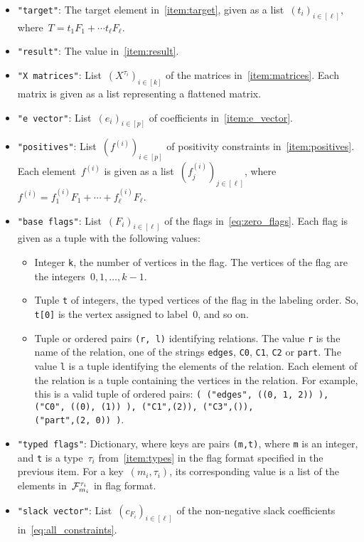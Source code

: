 \documentclass[11pt,a4paper,reqno]{amsart}
\begin{document}
\begin{itemize}
\item \verb|"target"|: The target element in~\ref{item:target}, given as a
  list~$(t_i)_{i \in [\ell]}$, where~$T = t_1F_1 + \cdots t_\ell F_\ell$.
\item \verb|"result"|: The value in~\ref{item:result}.
\item \verb|"X matrices"|: List~$(X^{\tau_i})_{i \in [k]}$ of the matrices in~\ref{item:matrices}. Each
  matrix is given as a list representing a flattened matrix.
\item \verb|"e vector"|: List~$(e_i)_{i \in [p]}$ of coefficients in~\ref{item:e_vector}.
\item \verb|"positives"|: List~$(f^{(i)})_{i \in [p]}$ of positivity constraints
  in~\ref{item:positives}. Each element~$f^{(i)}$ is given as a
  list~$(f^{(i)}_j)_{j \in [\ell]}$, where~$f^{(i)} = f^{(i)}_1 F_1 + \cdots + f^{(i)}_\ell F_\ell$.
\item \verb|"base flags"|: List~$(F_i)_{i \in [\ell]}$ of the flags in~\eqref{eq:zero_flags}. Each
  flag is given as a tuple with the following values:
  \begin{itemize}
  \item Integer \verb|k|, the number of vertices in the flag. The vertices of the flag
    are the integers~$0, 1, \dots, k - 1$.
  \item Tuple \verb|t| of integers, the typed vertices of the flag in the labeling
    order. So, \verb|t[0]| is the vertex assigned to label~$0$, and so on.
  \item Tuple or ordered pairs \verb|(r, l)| identifying relations. The value \verb|r| is
    the name of the relation, one of the strings \verb|edges|, \verb|C0|, \verb|C1|,
    \verb|C2| or \verb|part|. The value \verb|l| is a tuple identifying the elements
    of the relation. Each element of the relation is a tuple containing the vertices
    in the relation. For example, this is a valid tuple of ordered pairs:
    \verb|( ("edges", ((0, 1, 2)) ), ("C0", ((0), (1)) ), ("C1",(2)), ("C3",()),|\\
    \verb|("part",(2, 0)) )|.
  \end{itemize}
\item \verb|"typed flags"|: Dictionary, where keys are pairs \verb|(m,t)|, where \verb|m|
  is an integer, and \verb|t| is a type~$\tau_i$ from~\ref{item:types} in the flag format specified
  in the previous item. For a key~$(m_i, \tau_i)$, its corresponding value is a list of
  the elements in~${\mathcal F}_{m_i}^{\tau_i}$ in flag format.
\item \verb|"slack vector"|: List~$(c_{F_i})_{i \in [\ell]}$ of the non-negative slack
  coefficients in~\eqref{eq:all_constraints}.
\end{itemize}
\end{document}
